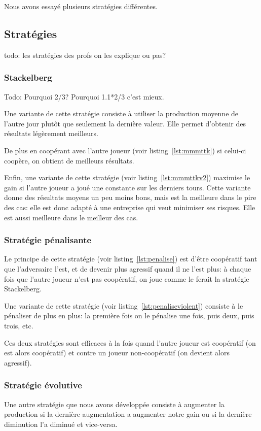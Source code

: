 \documentclass{scrartcl}
\begin{document}
    Nous avons essayé plusieurs stratégies différentes.

  \subsection{Stratégies}
    todo: les stratégies des profs on les explique ou pas?
    \subsubsection{Stackelberg}
      Todo: Pourquoi 2/3? Pourquoi 1.1*2/3 c'est mieux.

      Une variante de cette stratégie consiste à utiliser la production moyenne
      de l'autre jour plutôt que seulement la dernière valeur. Elle permet
      d'obtenir des résultats légèrement meilleurs.

      De plus en coopérant avec l'autre joueur (voir listing~\ref{lst:mmmttk})
      si celui-ci coopère, on obtient de meilleurs résultats.

      Enfin, une variante de cette stratégie (voir listing~\ref{lst:mmmttkv2})
      maximise le gain si l'autre joueur a joué une constante sur les derniers
      tours. Cette variante donne des résultats moyens un peu moins bons, mais
      est la meilleure dans le pire des cas: elle est donc adapté à une
      entreprise qui veut minimiser ses risques. Elle est aussi meilleure dans
      le meilleur des cas.

    \subsubsection{Stratégie pénalisante}
      Le principe de cette stratégie (voir listing~\ref{lst:penalise}) est
      d'être coopératif tant que l'adversaire l'est, et de devenir plus
      agressif quand il ne l'est plus: à chaque fois que l'autre joueur n'est
      pas coopératif, on joue comme le ferait la stratégie Stackelberg.

      Une variante de cette stratégie (voir listing~\ref{lst:penaliseviolent})
      consiste à le pénaliser de plus en plus: la première fois on le pénalise
      une fois, puis deux, puis trois, etc.

      Ces deux stratégies sont efficaces à la fois quand l'autre joueur est
      coopératif (on est alors coopératif) et contre un joueur non-coopératif
      (on devient alors agressif).

    \subsubsection{Stratégie évolutive}
      Une autre stratégie que nous avons développée consiste à augmenter la
      production si la dernière augmentation a augmenter notre gain ou si la
      dernière diminution l'a diminué et vice-versa.
\end{document}
